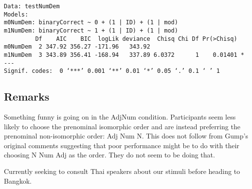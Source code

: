 \documentclass[11pt]{article}
\begin{document}
    
    \begin{verbatim}
Data: testNumDem
Models:
m0NumDem: binaryCorrect ~ 0 + (1 | ID) + (1 | mod)
m1NumDem: binaryCorrect ~ 1 + (1 | ID) + (1 | mod)
         Df    AIC    BIC  logLik deviance  Chisq Chi Df Pr(>Chisq)  
m0NumDem  2 347.92 356.27 -171.96   343.92                           
m1NumDem  3 343.89 356.41 -168.94   337.89 6.0372      1    0.01401 *
---
Signif. codes:  0 ‘***’ 0.001 ‘**’ 0.01 ‘*’ 0.05 ‘.’ 0.1 ‘ ’ 1

    \end{verbatim}

    
    \subsection{Remarks}\label{remarks}

Something funny is going on in the AdjNum condition. Participants seem
less likely to choose the prenominal isomorphic order and are instead
preferring the prenominal non-isomorphic order: Adj Num N. This does not
follow from Gump's original comments suggesting that poor performance
might be to do with their choosing N Num Adj as the order. They do not
seem to be doing that.

Currently seeking to consult Thai speakers about our stimuli before
heading to Bangkok.


    
    
    
    
\end{document}
